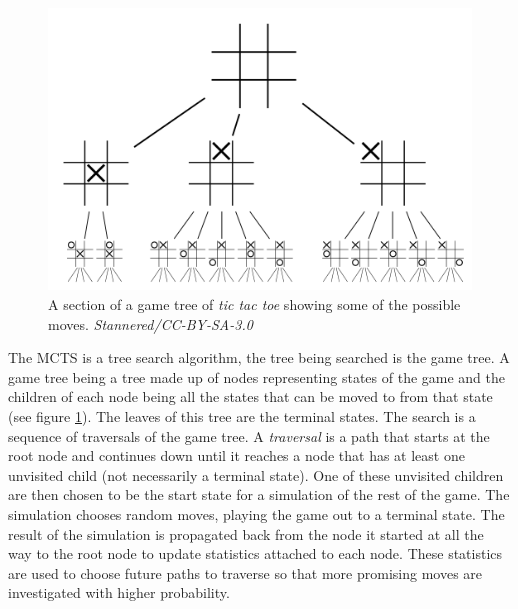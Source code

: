 \begin{figure}[ht]
	\centering
	\includegraphics[width=0.9\linewidth]{Tic-tac-toe-game-tree.png}
	\caption{A section of a game tree of \textit{tic tac toe} showing some of the possible moves. \textit{Stannered/CC-BY-SA-3.0}}
	\label{fig:game-tree}
\end{figure}

The MCTS is a tree search algorithm, the tree being searched is the game tree. A game tree being a tree made up of nodes representing states of the game and the children of each node being all the states that can be moved to from that state (see figure \ref{fig:game-tree}). The leaves of this tree are the terminal states. The search is a sequence of traversals of the game tree. A \textit{traversal} is a path that starts at the root node and continues down until it reaches a node that has at least one unvisited child (not necessarily a terminal state). One of these unvisited children are then chosen to be the start state for a simulation of the rest of the game. The simulation chooses random moves, playing the game out to a terminal state. The result of the simulation is propagated back from the node it started at all the way to the root node to update statistics attached to each node. These statistics are used to choose future paths to traverse so that more promising moves are investigated with higher probability.


